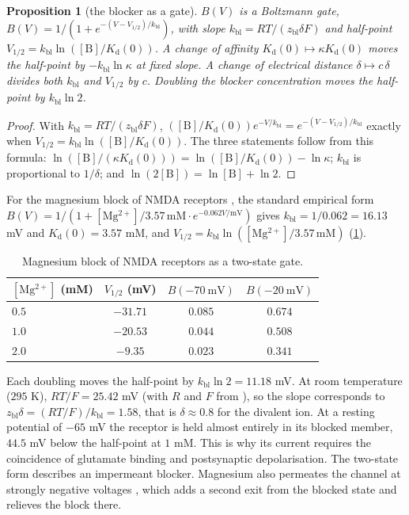 \documentclass[11pt]{article}
\newtheorem{proposition}[theorem]{Proposition}
\theoremstyle{definition}\newtheorem{definition}[theorem]{Definition}
\theoremstyle{remark}\newtheorem{remark}[theorem]{Remark}
\begin{document}
\begin{proposition}[the blocker as a gate]\label{prop:block}
$B(V)$ is a Boltzmann gate, $B(V)=1/(1+e^{-(V-V_{1/2})/k_{\mathrm{bl}}})$, with slope $k_{\mathrm{bl}}=RT/(z_{\mathrm{bl}}\delta F)$ and half-point $V_{1/2}=k_{\mathrm{bl}}\ln([\mathrm B]/K_{\mathrm d}(0))$. A change of affinity $K_{\mathrm d}(0)\mapsto\kappa K_{\mathrm d}(0)$ moves the half-point by $-k_{\mathrm{bl}}\ln\kappa$ at fixed slope. A change of electrical distance $\delta\mapsto c\,\delta$ divides both $k_{\mathrm{bl}}$ and $V_{1/2}$ by $c$. Doubling the blocker concentration moves the half-point by $k_{\mathrm{bl}}\ln2$.
\end{proposition}
\begin{proof}
With $k_{\mathrm{bl}}=RT/(z_{\mathrm{bl}}\delta F)$, $([\mathrm B]/K_{\mathrm d}(0))e^{-V/k_{\mathrm{bl}}}=e^{-(V-V_{1/2})/k_{\mathrm{bl}}}$ exactly when $V_{1/2}=k_{\mathrm{bl}}\ln([\mathrm B]/K_{\mathrm d}(0))$. The three statements follow from this formula: $\ln([\mathrm B]/(\kappa K_{\mathrm d}(0)))=\ln([\mathrm B]/K_{\mathrm d}(0))-\ln\kappa$; $k_{\mathrm{bl}}$ is proportional to $1/\delta$; and $\ln(2[\mathrm B])=\ln[\mathrm B]+\ln2$.
\end{proof}

For the magnesium block of NMDA receptors \cite{Nowak,Mayer}, the standard empirical form $B(V)=1/(1+[\mathrm{Mg^{2+}}]/3.57\,\mathrm{mM}\cdot e^{-0.062V/\mathrm{mV}})$ \cite{JahrStevens} gives $k_{\mathrm{bl}}=1/0.062=16.13$ mV and $K_{\mathrm d}(0)=3.57$ mM, and $V_{1/2}=k_{\mathrm{bl}}\ln([\mathrm{Mg^{2+}}]/3.57\,\mathrm{mM})$ (\cref{tab:mg}).

\begin{table}[htbp]\centering\small
\caption{Magnesium block of NMDA receptors as a two-state gate.}\label{tab:mg}
\begin{tabular}{@{}lccc@{}}\toprule
$[\mathrm{Mg^{2+}}]$ (mM) & $V_{1/2}$ (mV) & $B(-70\ \mathrm{mV})$ & $B(-20\ \mathrm{mV})$\\\midrule
$0.5$ & $-31.71$ & $0.085$ & $0.674$\\
$1.0$ & $-20.53$ & $0.044$ & $0.508$\\
$2.0$ & $-9.35$ & $0.023$ & $0.341$\\\bottomrule
\end{tabular}
\end{table}

Each doubling moves the half-point by $k_{\mathrm{bl}}\ln2=11.18$ mV. At room temperature ($295$ K), $RT/F=25.42$ mV (with $R$ and $F$ from \cite{CODATA}), so the slope corresponds to $z_{\mathrm{bl}}\delta=(RT/F)/k_{\mathrm{bl}}=1.58$, that is $\delta\approx0.8$ for the divalent ion. At a resting potential of $-65$ mV the receptor is held almost entirely in its blocked member, $44.5$ mV below the half-point at $1$ mM. This is why its current requires the coincidence of glutamate binding and postsynaptic depolarisation. The two-state form describes an impermeant blocker. Magnesium also permeates the channel at strongly negative voltages \cite{AntonovJohnson}, which adds a second exit from the blocked state and relieves the block there.
\end{document}
